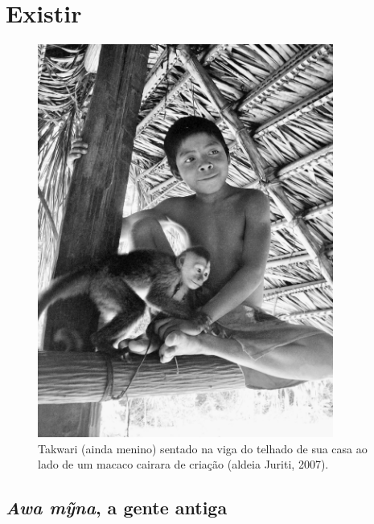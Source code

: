 
\chapter{Existir}\label{existir}

\begin{figure}[!ht]
\centering
\captionsetup{width=97mm}
  \includegraphics[width=97mm]{./imgs/100_4768}
\caption{Takwari (ainda menino) sentado na viga do telhado de sua casa ao lado de um
macaco cairara de criação (aldeia Juriti, 2007).}
\end{figure}

\section{\emph{Awa mỹna}, a gente antiga}\label{awa-mux1ef9na-a-gente-antiga}

